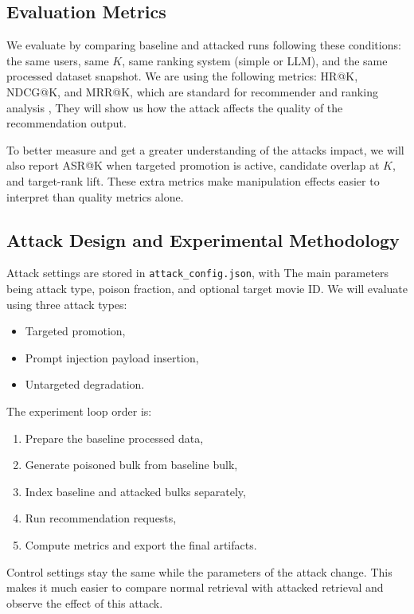 \subsection{Evaluation Metrics}

We evaluate by comparing baseline and attacked runs following these conditions: the same users, same $K$, same ranking system (simple or LLM), and the same processed dataset snapshot. We are using the following metrics: HR@K, NDCG@K, and MRR@K, which are standard for recommender and ranking analysis \cite{herlocker2004evaluating,wang2013ndcg}, They will show us how the attack affects the quality of the recommendation output.

To better measure and get a greater understanding of the attacks impact, we will also report ASR@K when targeted promotion is active, candidate overlap at $K$, and target-rank lift. These extra metrics make manipulation effects easier to interpret than quality metrics alone.

\subsection{Attack Design and Experimental Methodology}

Attack settings are stored in \texttt{attack\_config.json}, with The main parameters being attack type, poison fraction, and optional target movie ID.  We will evaluate using three attack types:

\begin{itemize}
  \item Targeted promotion,
  \item Prompt injection payload insertion,
  \item Untargeted degradation.
\end{itemize}

The experiment loop order is:

\begin{enumerate}
  \item Prepare the baseline processed data,
  \item Generate poisoned bulk from baseline bulk,
  \item Index baseline and attacked bulks separately,
  \item Run recommendation requests,
  \item Compute metrics and export the final artifacts.
\end{enumerate}

Control settings stay the same while the parameters of the attack change. This makes it much easier to compare normal retrieval with attacked retrieval and observe the effect of this attack.

